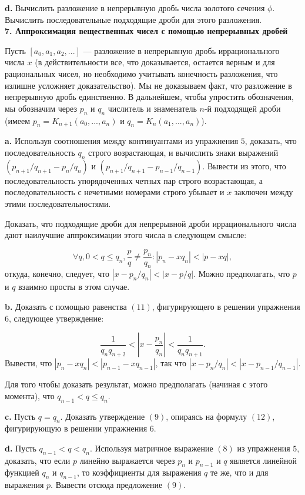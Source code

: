 \textbf{d.} Вычислить разложение в непрерывную дробь числа золотого 
сечения $\phi$. Вычислить последовательные подходящие дроби для этого 
разложения.
\\

\noindent \textbf{7. Аппроксимация вещественных чисел с помощью
непрерывных дробей}

Пусть $[a_0,a_1,a_2,...]$ — разложение в непрерывную дробь 
иррационального числа $x$ (в действительности все, что доказывается, 
остается верным и для рациональных чисел, но необходимо учитывать 
конечность разложения, что излишне усложняет доказательство). Мы не
доказываем факт, что разложение в непрерывную дробь 
единственно. В дальнейшем, чтобы упростить обозначения, мы обозначим 
через $p_n$ и $q_n$ числитель и знаменатель $n$-й подходящей дроби (имеем
$p_n = K_{n+1}(a_0,...,a_n)$ и $q_n = K_n(a_1,...,a_n)$).

\textbf{a.} Используя соотношения между континуантами из упражнения $5$,
доказать, что последовательность $q_n$ строго возрастающая, и 
вычислить знаки выражений $(p_{n+1}/q_{n+1} - p_n/q_n)$ и $(p_{n+1}/q_{n+1} -p_{n-1}/q_{n-1})$. Вывести из этого, что последовательность упорядоченных четных пар строго возрастающая, а последовательность с нечетными номерами
строго убывает и $x$ заключен между этими последовательностями.

Доказать, что подходящие дроби для непрерывной дроби 
иррационального числа дают наилучшие аппроксимации этого числа в 
следующем смысле:

\[
\forall q, 0<q \le q_n, \frac{p}{q} \ne \frac{p_n}{q_n}: |p_n-xq_n|<|p-xq|,
\]
откуда, конечно, следует, что $|x-p_n/q_n|<|x-p/q|$. Можно 
предполагать, что $p$ и $q$ взаимно просты в этом случае.

\textbf{b.} Доказать с помощью равенства $(11)$, фигурирующего в решении
упражнения $6$, следующее утверждение:

\[
\frac{1}{q_nq_{n+2}}<|x-\frac{p_n}{q_n}|<\frac{1}{q_nq_{n+1}}.
\]
Вывести, что $|p_n-xq_n| < |p_{n-1}-xq_{n-1}|$, так что $|x-p_n/q_n|<|x-p_{n-1}/q_{n-1}|$.

Для того чтобы доказать результат, можно предполагать (начиная
с этого момента), что $q_{n-1} < q \le q_n$.

\textbf{c.} Пусть $q = q_n$. Доказать утверждение $(9)$, опираясь на 
формулу $(12)$, фигурирующую в решении упражнения $6$.

\textbf{d.} Пусть $q_{n-1}<q<q_n$. Используя матричное выражение $(8)$ из
упражнения $5$, доказать, что если $p$ линейно выражается через $p_n$ и
$p_{n-1}$ и $q$ является линейной функцией $q_n$ и $q_{n-1}$, то коэффициенты для выражения $q$ те же, что и для выражения $p$. Вывести отсюда 
предложение $(9)$.

